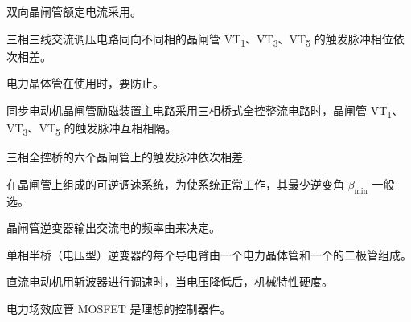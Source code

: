 \documentclass[电力电子]{subfiles}
\begin{document}
\begin{ti}
	双向晶闸管额定电流采用。
\end{ti}

\begin{ti}
	三相三线交流调压电路同向不同相的晶闸管 VT\textsubscript{1}、VT\textsubscript{3}、VT\textsubscript{5} 的触发脉冲相位依次相差。
\end{ti}

\begin{ti}
	电力晶体管在使用时，要防止。
\end{ti}

\begin{ti}
	同步电动机晶闸管励磁装置主电路采用三相桥式全控整流电路时，晶闸管 VT\textsubscript{1}、VT\textsubscript{3}、VT\textsubscript{5} 的触发脉冲互相相隔。
\end{ti}

\begin{ti}
	三相全控桥的六个晶闸管上的触发脉冲依次相差.
\end{ti}

\begin{ti}
	在晶闸管上组成的可逆调速系统，为使系统正常工作，其最少逆变角 $\beta_{\min}$ 一般选。
\end{ti}

\begin{ti}
	晶闸管逆变器输出交流电的频率由来决定。
\end{ti}

\begin{ti}
	单相半桥（电压型）逆变器的每个导电臂由一个电力晶体管和一个的二极管组成。
\end{ti}

\begin{ti}
	直流电动机用斩波器进行调速时，当电压降低后，机械特性硬度。
\end{ti}

\begin{ti}
	电力场效应管 MOSFET 是理想的控制器件。
\end{ti}
\end{document}
